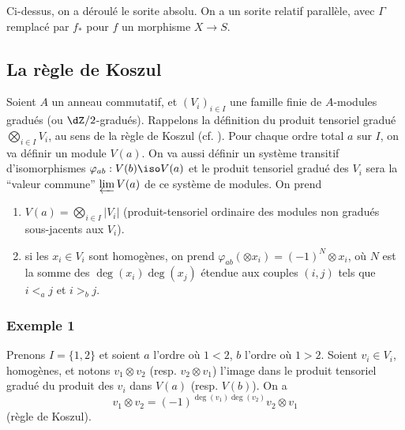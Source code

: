 \subsubsection{}\label{IV:1-2-6}

Ci-dessus, on a déroulé le sorite absolu. On a un sorite relatif 
parallèle, avec $\Gamma$ remplacé par $f_*$ pour $f$ un morphisme $X\to S$. 










\subsection{La règle de Koszul}\label{IV:1-3}

Soient $A$ un anneau commutatif, et $(V_i)_{i\in I}$ une famille finie de 
$A$-modules gradués (ou $\dZ/2$-gradués). Rappelons la définition du 
produit tensoriel gradué $\bigotimes_{i\in I} V_i$, au sens de la règle de 
Koszul (cf. ). Pour chaque ordre total $a$ sur $I$, on va 
définir un module $V(a)$. On va aussi définir un système transitif 
d'isomorphismes $\varphi_{a b}:V(b)\iso V(a)$ et le produit tensoriel 
gradué des $V_i$ sera la ``valeur commune'' $\varprojlim V(a)$ de ce 
système de modules. On prend 
\begin{enumerate}[\indent a)]
  \item $V(a) = \bigotimes_{i\in I} |V_i|$ (produit-tensoriel ordinaire des 
    modules non gradués sous-jacents aux $V_i$).
  \item si les $x_i\in V_i$ sont homogènes, on prend 
    $\varphi_{a b}(\otimes x_i) = (-1)^N \otimes x_i$, où $N$ est la somme 
    des $\deg(x_i)\deg(x_j)$ étendue aux couples $(i,j)$ tels que 
    $i<_a j$ et $i>_b j$.
\end{enumerate}





\subsubsection*{Exemple 1}

Prenons $I=\{1,2\}$ et soient $a$ l'ordre où $1<2$, $b$ l'ordre où $1>2$. 
Soient $v_i\in V_i$, homogènes, et notons $v_1\otimes v_2$ (resp. 
$v_2\otimes v_1$) l'image dans le produit tensoriel gradué du produit des 
$v_i$ dans $V(a)$ (resp. $V(b)$). On a 
\[
  v_1\otimes v_2 = (-1)^{\deg(v_1)\deg(v_2)} v_2\otimes v_1
\]
(règle de Koszul). 





